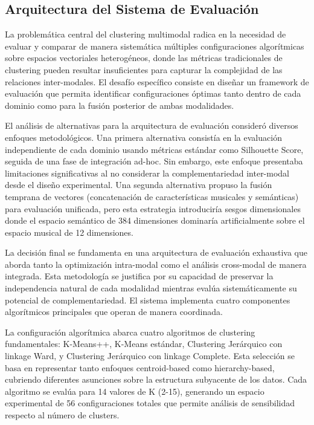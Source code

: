 \documentclass[12pt,a4paper]{report}
\begin{document}
\subsection{Arquitectura del Sistema de Evaluación}

La problemática central del clustering multimodal radica en la necesidad de evaluar y comparar de manera sistemática múltiples configuraciones algorítmicas sobre espacios vectoriales heterogéneos, donde las métricas tradicionales de clustering pueden resultar insuficientes para capturar la complejidad de las relaciones inter-modales. El desafío específico consiste en diseñar un framework de evaluación que permita identificar configuraciones óptimas tanto dentro de cada dominio como para la fusión posterior de ambas modalidades.

El análisis de alternativas para la arquitectura de evaluación consideró diversos enfoques metodológicos. Una primera alternativa consistía en la evaluación independiente de cada dominio usando métricas estándar como Silhouette Score, seguida de una fase de integración ad-hoc. Sin embargo, este enfoque presentaba limitaciones significativas al no considerar la complementariedad inter-modal desde el diseño experimental. Una segunda alternativa propuso la fusión temprana de vectores (concatenación de características musicales y semánticas) para evaluación unificada, pero esta estrategia introduciría sesgos dimensionales donde el espacio semántico de 384 dimensiones dominaría artificialmente sobre el espacio musical de 12 dimensiones.

La decisión final se fundamenta en una arquitectura de evaluación exhaustiva que aborda tanto la optimización intra-modal como el análisis cross-modal de manera integrada. Esta metodología se justifica por su capacidad de preservar la independencia natural de cada modalidad mientras evalúa sistemáticamente su potencial de complementariedad. El sistema implementa cuatro componentes algorítmicos principales que operan de manera coordinada.

La configuración algorítmica abarca cuatro algoritmos de clustering fundamentales: K-Means++, K-Means estándar, Clustering Jerárquico con linkage Ward, y Clustering Jerárquico con linkage Complete. Esta selección se basa en representar tanto enfoques centroid-based como hierarchy-based, cubriendo diferentes asunciones sobre la estructura subyacente de los datos. Cada algoritmo se evalúa para 14 valores de K (2-15), generando un espacio experimental de 56 configuraciones totales que permite análisis de sensibilidad respecto al número de clusters.
\end{document}
